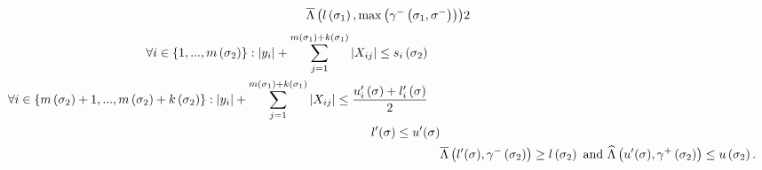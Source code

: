 \begin{lemma}
\begin{align}
\begin{split}
{\overline{\Lambda}\left(l\left(\sigma_{1}\right),\max\left(\gamma^-\left(\sigma_{1},\sigma^-\right)\right)\right)}{2}
\end{split}
\end{align}
\begin{align}
\begin{split}
& \forall i\in \{1,...,m\left(\sigma_{2}\right)\}:
 \left|y_i\right|+\sum_{j=1}^{m\left(\sigma_{1}\right)+k\left(\sigma_{1}\right)}\left|X_{ij}\right|\leq s_i\left(\sigma_{2}\right)
\end{split}\\
\begin{split}
& \forall i\in
\left\{m\left(\sigma_{2}\right)+1,...,m\left(\sigma_{2}\right)+k\left(\sigma_{2}\right)\right\}:
\left|y_i\right|+\sum_{j=1}^{m\left(\sigma_{1}\right)+k\left(\sigma_{1}\right)}\left|X_{ij}\right|\leq \frac{u^\prime_i\left(\sigma\right)+l^\prime_i\left(\sigma\right)}{2}
\end{split}\\
\begin{split}
l^\prime(\sigma)\leq u^\prime(\sigma)
\end{split}\\
& \overline{\Lambda}\left(l^\prime(\sigma),\gamma^-\left(\sigma_{2}\right)\right)\geq
l\left(\sigma_{2}\right)~\text{and}~\widehat{\Lambda}\left(u^\prime(\sigma),\gamma^+\left(\sigma_{2}\right)\right)\leq u\left(\sigma_{2}\right).
\end{align}
\end{lemma}
